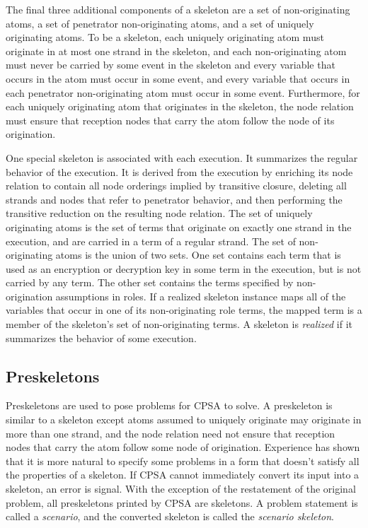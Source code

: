 \documentclass[12pt]{article}
\begin{document}
The final three additional components of a skeleton are a set of
non-originating atoms, a set of penetrator non-originating atoms, and
a set of uniquely originating atoms.  To be a skeleton, each uniquely
originating atom must originate in at most one strand in the skeleton,
and each non-originating atom must never be carried by some event in
the skeleton and every variable that occurs in the atom must occur in
some event, and every variable that occurs in each penetrator
non-originating atom must occur in some event.  Furthermore, for each
uniquely originating atom that originates in the skeleton, the node
relation must ensure that reception nodes that carry the atom follow
the node of its origination.

One special skeleton is associated with each execution.  It summarizes
the regular behavior of the execution.  It is derived from the
execution by enriching its node relation to contain all node orderings
implied by transitive closure, deleting all strands and nodes that
refer to penetrator behavior, and then performing the transitive
reduction on the resulting node relation.  The set of uniquely
originating atoms is the set of terms that originate on exactly one
strand in the execution, and are carried in a term of a regular
strand.  The set of non-originating atoms is the union of two sets.
One set contains each term that is used as an encryption or decryption
key in some term in the execution, but is not carried by any term.
The other set contains the terms specified by non-origination
assumptions in roles.  If a realized skeleton instance maps all of the
variables that occur in one of its non-originating role terms, the
mapped term is a member of the skeleton's set of non-originating
terms.  A skeleton is \emph{realized} if it summarizes the behavior of
some execution.

\subsection{Preskeletons}

Preskeletons are used to pose problems for CPSA to solve.  A
preskeleton is similar to a skeleton except atoms assumed to uniquely
originate may originate in more than one strand, and the node relation
need not ensure that reception nodes that carry the atom follow some
node of origination.  Experience has shown that it is more natural to
specify some problems in a form that doesn't satisfy all the
properties of a skeleton.  If CPSA cannot immediately convert its
input into a skeleton, an error is signal.  With the exception of the
restatement of the original problem, all preskeletons printed by CPSA
are skeletons.  A problem statement is called a \emph{scenario}, and
the converted skeleton is called the \emph{scenario skeleton}.
\end{document}

